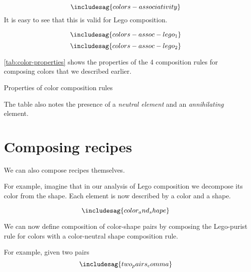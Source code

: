 \begin{equation*}
  \includesag{colors-associativity}
\end{equation*}
It is easy to see that this is valid for Lego composition.

\begin{equation*}
  \includesag{colors-assoc-lego_1}
\end{equation*}
\begin{equation*}
  \includesag{colors-assoc-lego_2}
\end{equation*}

\cref{tab:color-properties} shows the properties of the 4 composition rules for composing colors that we described earlier.


\begin{table*}
  \caption{Properties of color composition rules}
  \label{tab:color-properties}
\end{table*}

The table also notes the presence of a \emph{neutral element} and an \emph{annihilating} element.


%


\section{Composing recipes}

We can also compose recipes themselves.

For example, imagine that in our analysis of Lego composition we decompose its color from the shape.
Each element is now described by a color and a shape.

\begin{equation}
  \label{eq:color-and-shape}
\includesag{color_and_shape}
\end{equation}

We can now define composition of color-shape pairs by composing the Lego-purist rule for colors with a color-neutral shape composition rule.

For example, given two pairs
%
\begin{equation*}
\includesag{two_pairs_comma}
\end{equation*}

